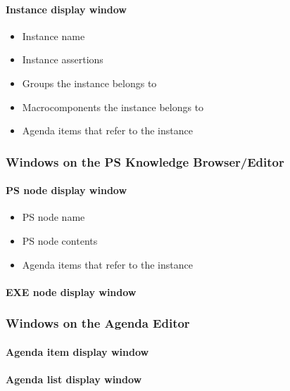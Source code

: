 \documentclass[11pt]{article}
\begin{document}
\paragraph{Instance display window}
\begin{itemize}
\item Instance name
\item Instance assertions
\item Groups the instance belongs to
\item Macrocomponents the instance belongs to
\item Agenda items that refer to the instance
\end{itemize}



\subsubsection{Windows on the PS Knowledge Browser/Editor}

\paragraph{PS node display window}
\begin{itemize}
\item PS node name
\item PS node contents
\item Agenda items that refer to the instance
\end{itemize}

\paragraph{EXE node display window}



\subsubsection{Windows on the Agenda Editor}

\paragraph{Agenda item display window}

\paragraph{Agenda list display window}



\small


\end{document}
